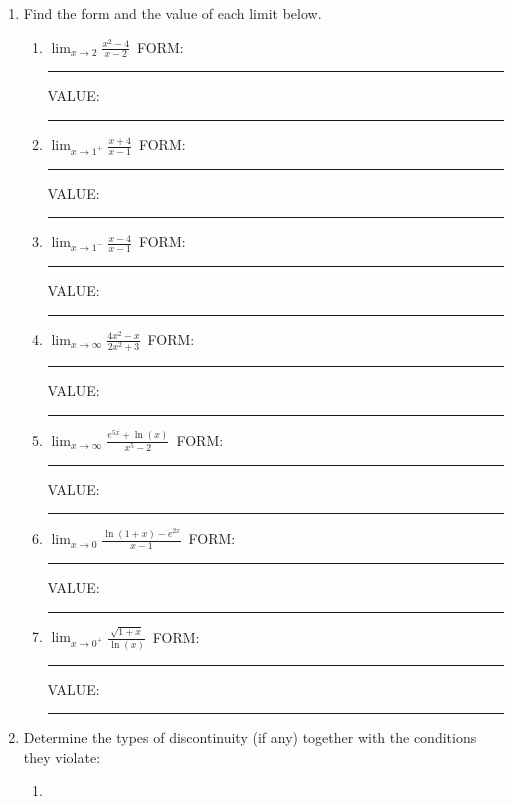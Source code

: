 \documentclass[11pt]{article}
\begin{document}
\begin{enumerate}
\item[\textbf{L2.}]
Find the form and the value of each limit below.

\begin{enumerate}

\item $\displaystyle\lim_{x\to 2} \frac{x^2-4}{x-2}$ 
\dotfill \,FORM: \rule[-8pt]{0.8in}{0.4pt} \quad VALUE: \rule[-8pt]{0.5in}{0.4pt}

\vfill
\vfill
\vfill

\item $\displaystyle\lim_{x\to 1^{+}} \frac{x+4}{x-1}$ 
\dotfill \,FORM: \rule[-8pt]{0.8in}{0.4pt} \quad VALUE: \rule[-8pt]{0.5in}{0.4pt}

\vfill
\vfill
\vfill

\item $\displaystyle\lim_{x\to 1^{-}} \frac{x-4}{x-1}$ 
\dotfill \,FORM: \rule[-8pt]{0.8in}{0.4pt} \quad VALUE: \rule[-8pt]{0.5in}{0.4pt}

\vfill
\vfill
\vfill

\item $\displaystyle\lim_{x\to \infty} \frac{4x^2-x}{2x^2+3}$ 
\dotfill \,FORM: \rule[-8pt]{0.8in}{0.4pt} \quad VALUE: \rule[-8pt]{0.5in}{0.4pt}

\vfill
\vfill
\vfill

\item $\displaystyle\lim_{x\to\infty} \frac{e^{5x}+ \ln(x)}{x^{5} - 2}$
\dotfill \,FORM: \rule[-8pt]{0.8in}{0.4pt} \quad VALUE: \rule[-8pt]{0.5in}{0.4pt}
\vfill
\vfill
\vfill

\item
$\displaystyle\lim_{x\to0} \frac{\ln(1+x)-e^{2x}}{x-1}$
\hspace{1cm}
\dotfill \,FORM: \rule[-8pt]{0.8in}{0.4pt} \quad VALUE: \rule[-8pt]{0.5in}{0.4pt}
\vfill
\vfill
\vfill

\item
$\displaystyle\lim_{x\to 0^{+}} \frac{\sqrt{1+x}}{\ln(x)}$
\hspace{1cm}
\dotfill \,FORM: \rule[-8pt]{0.8in}{0.4pt} \quad VALUE: \rule[-8pt]{0.5in}{0.4pt}
\vfill
\vfill
\vfill

\end{enumerate}
\newpage
\item[\textbf{L1.}]
Determine the types of discontinuity (if any)
together with the conditions they violate:

\begin{enumerate}
\item[(a)]
\noindent
\begin{minipage}[t]{0.4\textwidth}
\vspace{0pt}
\end{minipage}
\end{enumerate}
\end{enumerate}
\end{document}

